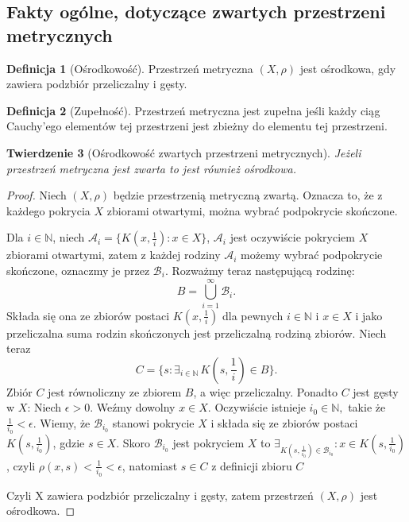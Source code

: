 \documentclass[licencjacka]{pwr_wmat_praca_dyplomowa}
\theoremstyle{plain}
\newtheorem{theorem}{Twierdzenie}
\numberwithin{theorem}{chapter}
\theoremstyle{definition}
\numberwithin{theorem}{chapter}
\newtheorem{definition}[theorem]{Definicja}
\begin{document}
\subsection{Fakty ogólne, dotyczące zwartych przestrzeni metrycznych}


\begin{definition}[Ośrodkowość]
Przestrzeń metryczna $(X, \rho)$ jest ośrodkowa, gdy zawiera podzbiór przeliczalny i gęsty.
\end{definition}


\begin{definition}[Zupełność]
Przestrzeń metryczna jest zupełna jeśli każdy ciąg Cauchy'ego elementów tej przestrzeni jest zbieżny do elementu tej przestrzeni.
\end{definition}


\begin{theorem}[Ośrodkowość zwartych przestrzeni metrycznych] \label{zwarta_jest_osrodkowa}
Jeżeli przestrzeń metryczna jest zwarta to jest również ośrodkowa.
\end{theorem}

\begin{proof}
Niech $(X, \rho)$ będzie przestrzenią metryczną zwartą. Oznacza to, że z każdego pokrycia $X$ zbiorami otwartymi, można wybrać podpokrycie skończone.

Dla $i \in \mathbb{N}$, niech $\mathcal{A}_{i} = \{ K(x, \frac{1}{i}) : x \in X \}$, $\mathcal{A}_{i}$ jest oczywiście pokryciem $X$ zbiorami otwartymi, zatem z każdej rodziny $\mathcal{A}_{i}$ możemy wybrać podpokrycie skończone, oznaczmy je przez $\mathcal{B}_{i}$. Rozważmy teraz następującą rodzinę: 
$$B = \bigcup\limits_{i=1}^{\infty} \mathcal{B}_{i}.$$
Składa się ona ze zbiorów postaci $K(x, \frac{1}{i})$ dla pewnych $i \in \mathbb{N}$ i $x \in X$ i jako przeliczalna suma rodzin skończonych jest przeliczalną rodziną zbiorów.
Niech teraz 
$$C = \{ s : \exists_{i \in \mathbb{N}} \, K\left(s, \frac{1}{i}\right) \in B \}.$$
Zbiór $C$ jest równoliczny ze zbiorem $B$, a więc przeliczalny.
Ponadto $C$ jest gęsty w $X$:
Niech $\epsilon > 0$. Weźmy dowolny $x \in X$. Oczywiście istnieje $i_0 \in \mathbb{N},$ takie że $\frac{1}{i_0} < \epsilon$. Wiemy, że $\mathcal{B}_{i_0}$ stanowi pokrycie $X$ i składa się ze zbiorów postaci $K(s, \frac{1}{i_0})$, gdzie $s \in X$. Skoro $\mathcal{B}_{i_0}$ jest pokryciem $X$ to $\exists_{K(s, \frac{1}{i_0}) \in \mathcal{B}_{i_0}} : x \in K(s, \frac{1}{i_0})$, czyli $\rho(x, s) < \frac{1}{i_0} < \epsilon$, natomiast $s \in C$ z definicji zbioru $C$

Czyli X zawiera podzbiór przeliczalny i gęsty, zatem przestrzeń $(X, \rho)$ jest ośrodkowa.
\end{proof}
\end{document}
